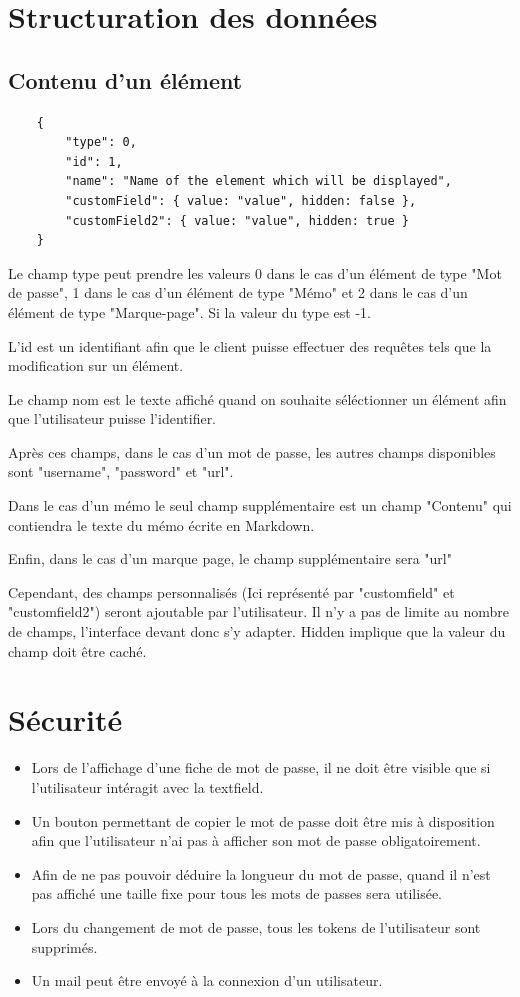 \documentclass[oneside]{report}
\begin{document}
	\section{Structuration des données}{
		\subsection{Contenu d'un élément} {
			\vspace{.5cm}
			\begin{lstlisting}
	{
		"type": 0,
		"id": 1,
		"name": "Name of the element which will be displayed",
		"customField": { value: "value", hidden: false },
		"customField2": { value: "value", hidden: true }
	}
			\end{lstlisting}
			\vspace{1cm}
			\par Le champ type peut prendre les valeurs 0 dans le cas d'un élément de type "Mot de passe", 1 dans le cas d'un élément de type "Mémo" et 2 dans le cas d'un élément de type "Marque-page". Si la valeur du type est -1.
			\par L'id est un identifiant afin que le client puisse effectuer des requêtes tels que la modification sur un élément.
			\par Le champ nom est le texte affiché quand on souhaite séléctionner un élément afin que l'utilisateur puisse l'identifier.
			\par Après ces champs, dans le cas d'un mot de passe, les autres champs disponibles sont "username", "password" et "url".
			\par Dans le cas d'un mémo le seul champ supplémentaire est un champ "Contenu" qui contiendra le texte du mémo écrite en Markdown.
			\par Enfin, dans le cas d'un marque page, le champ supplémentaire sera "url"
			\par Cependant, des champs personnalisés (Ici représenté par "customfield" et "customfield2") seront ajoutable par l'utilisateur. Il n'y a pas de limite au nombre de champs, l'interface devant donc s'y adapter. Hidden implique que la valeur du champ doit être caché.
		}
	}
	\section{Sécurité}{
		\begin{itemize}
			\item Lors de l'affichage d'une fiche de mot de passe, il ne doit être visible que si l'utilisateur intéragit avec la textfield.
			\item Un bouton permettant de copier le mot de passe doit être mis à disposition afin que l'utilisateur n'ai pas à afficher son mot de passe obligatoirement.
			\item Afin de ne pas pouvoir déduire la longueur du mot de passe, quand il n'est pas affiché une taille fixe pour tous les mots de passes sera utilisée.
			\item Lors du changement de mot de passe, tous les tokens de l'utilisateur sont supprimés.
			\item Un mail peut être envoyé à la connexion d'un utilisateur.
		\end{itemize}
	}
\end{document}
